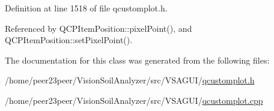 Definition at line 1518 of file qcustomplot.\+h.



Referenced by Q\+C\+P\+Item\+Position\+::pixel\+Point(), and Q\+C\+P\+Item\+Position\+::set\+Pixel\+Point().



The documentation for this class was generated from the following files\+:\begin{DoxyCompactItemize}
\item 
/home/peer23peer/\+Vision\+Soil\+Analyzer/src/\+V\+S\+A\+G\+U\+I/\hyperlink{qcustomplot_8h}{qcustomplot.\+h}\item 
/home/peer23peer/\+Vision\+Soil\+Analyzer/src/\+V\+S\+A\+G\+U\+I/\hyperlink{qcustomplot_8cpp}{qcustomplot.\+cpp}\end{DoxyCompactItemize}
